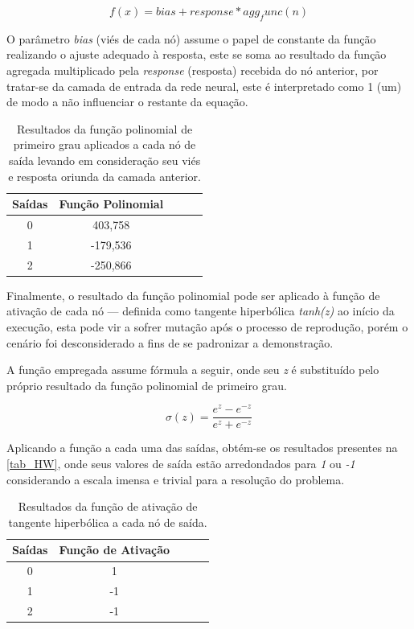 \[ f(x) = bias + response * agg_func(n)\]

O parâmetro \textit{bias} (viés de cada nó) assume o papel de constante da função realizando o ajuste adequado à resposta,
este se soma ao resultado da função agregada multiplicado pela \textit{response} (resposta) recebida do nó anterior,
por tratar-se da camada de entrada da rede neural, este é interpretado como 1 (um) de modo a não influenciar o restante da equação.

\begin{table}[htb]
	\centering
    \caption{\label{tab_HX}Resultados da função polinomial de primeiro grau aplicados a cada nó de saída levando em consideração seu viés e resposta oriunda da camada anterior.}
    \begin{tabular}{ccccc}
        \hline
		\textbf{Sa\'{i}das} & \textbf{Fun\c{c}\~{a}o Polinomial} \\ \hline
		0 & 403,758    \\ \hline
		1 & -179,536    \\ \hline
		2 & -250,866  \\ \hline
    \end{tabular}
    
\end{table}

Finalmente, o resultado da função polinomial pode ser aplicado à função de ativação de cada nó — definida como
tangente hiperbólica \textit{tanh(z)} ao início da execução, esta pode vir a sofrer mutação após o processo de reprodução,
porém o cenário foi desconsiderado a fins de se padronizar a demonstração.

A função empregada assume fórmula a seguir, onde seu \textit{z} é substituído pelo próprio resultado da função polinomial de primeiro grau.

\[ \sigma(z) = \frac{e^z - e^{-z}}{e^z + e^{-z}}\]

Aplicando a função a cada uma das saídas, obtém-se os resultados presentes na \autoref{tab_HW}, onde
seus valores de saída estão arredondados para \textit{1} ou \textit{-1} considerando a escala imensa e trivial para a resolução do problema.

\begin{table}[htb]
	\centering
    \caption{\label{tab_HW}Resultados da função de ativação de tangente hiperbólica a cada nó de saída.}
    \begin{tabular}{ccccc}
        \hline
		\textbf{Sa\'{i}das} & \textbf{Fun\c{c}\~{a}o de Ativa\c{c}\~{a}o} \\ \hline
		0 & 1    \\ \hline
		1 & -1    \\ \hline
		2 & -1  \\ \hline
    \end{tabular}
    
\end{table}

